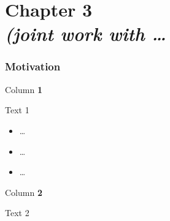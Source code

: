 \section{Chapter 3 \\\textit{(joint work with \ldots}}

\begin{frame}[t]\frametitle{Motivation}
  \begin{minipage}[t]{0.45\textwidth}
    \vspace{0pt}

    \colorbox{shadecolor}{\parbox[c][1\baselineskip][t]{\textwidth}{Column \textbf{1}}}
    \vspace{1em}
    \raggedright \pause
    Text 1 \\
    \begin{itemize}
      \item \ldots
      \item \ldots
      \item \ldots
    \end{itemize}
    \vspace{0pt}
  \end{minipage}%
  \hfill
  \begin{minipage}[t]{0.5\textwidth}
    \vspace{0pt}
    \colorbox{shadecolor}{\parbox[c][1\baselineskip][t]{\textwidth}{Column \textbf{2}}}
    \vspace{1em}
    \raggedright \pause
    Text 2
  \end{minipage}
\end{frame}
